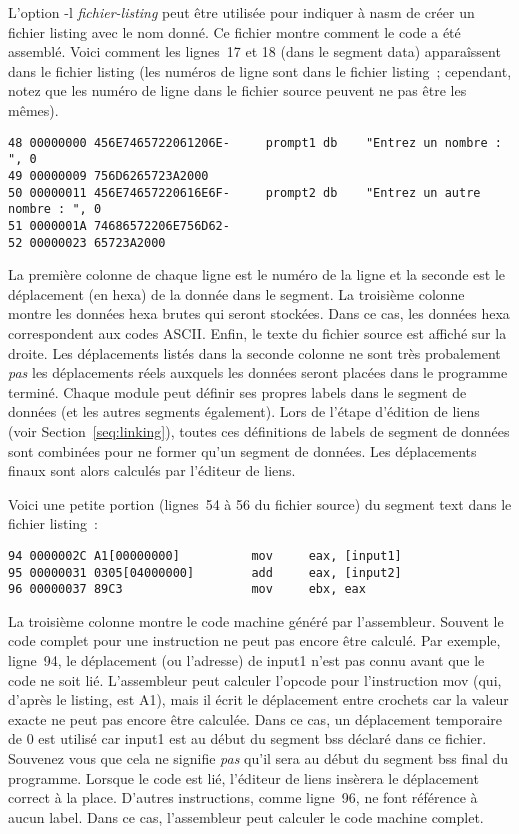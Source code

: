 {L'option {\code -l {\em fichier-listing}} peut être utilisée pour indiquer
à {\code nasm} de créer un fichier listing avec le nom donné. Ce fichier
montre comment le code a été assemblé. Voici comment les lignes~17 et 18
(dans le segment data) apparaîssent dans le fichier listing (les numéros
de ligne sont dans le fichier listing~; cependant, notez que les
numéro de ligne dans le fichier source peuvent ne pas être les mêmes).
\begin{Verbatim}[xleftmargin=\AsmMargin]
48 00000000 456E7465722061206E-     prompt1 db    "Entrez un nombre : ", 0
49 00000009 756D6265723A2000
50 00000011 456E74657220616E6F-     prompt2 db    "Entrez un autre nombre : ", 0
51 0000001A 74686572206E756D62-
52 00000023 65723A2000
 \end{Verbatim}
La première colonne de chaque ligne est le numéro de la ligne et la seconde
est le déplacement (en hexa) de la donnée dans le segment. La troisième colonne
montre les données hexa brutes qui seront stockées. Dans ce cas, les données
hexa correspondent aux codes ASCII. Enfin, le texte du fichier source est
affiché sur la droite. Les déplacements listés dans la seconde colonne ne sont
très probalement \emph{pas} les déplacements réels auxquels les données seront
placées dans le programme terminé. Chaque module peut définir ses propres labels
dans le segment de données (et les autres segments également). Lors de l'étape
d'édition de liens (voir Section~\ref{seq:linking}), toutes ces définitions
de labels de segment de données sont combinées pour ne former qu'un segment de
données. Les déplacements finaux sont alors calculés par l'éditeur
de liens.

Voici une petite portion (lignes~54 à 56 du fichier source) du segment
text dans le fichier listing~:
\begin{Verbatim}[xleftmargin=\AsmMargin]
94 0000002C A1[00000000]          mov     eax, [input1]
95 00000031 0305[04000000]        add     eax, [input2]
96 00000037 89C3                  mov     ebx, eax
\end{Verbatim}
La troisième colonne montre le code machine généré par l'assembleur.
Souvent le code complet pour une instruction ne peut pas encore
être calculé. Par exemple, ligne~94, le déplacement (ou l'adresse)
de {\code input1} n'est pas connu avant que le code ne soit lié.
L'assembleur peut calculer l'opcode pour l'instruction {\code mov}
(qui, d'après le listing, est A1), mais il écrit le déplacement entre
crochets car la valeur exacte ne peut pas encore être calculée. Dans
ce cas, un déplacement temporaire de 0 est utilisé car {\code input1}
est au début du segment bss déclaré dans ce fichier. Souvenez vous que
cela ne signifie \emph{pas} qu'il sera au début du segment bss final du
programme. Lorsque le code est lié, l'éditeur de liens insèrera le
déplacement correct à la place. D'autres instructions, comme ligne~96,
ne font référence à aucun label. Dans ce cas, l'assembleur peut calculer
le code machine complet.

}
